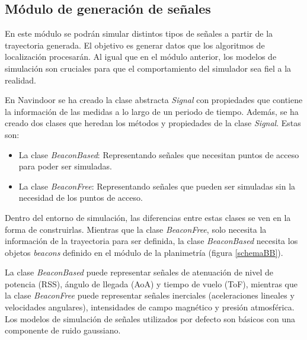 
\subsection{ Módulo de generación de señales}

En este módulo se podrán simular distintos tipos de señales a partir de la trayectoria generada. El objetivo es generar datos que los algoritmos de localización procesarán. Al igual que en el módulo anterior, los modelos de simulación son cruciales para que el comportamiento del simulador sea fiel a la realidad. 

En Navindoor se ha creado la clase abstracta \emph{Signal} con propiedades que contiene la información de las medidas a lo largo de un periodo de tiempo. Además, se ha creado dos clases que heredan los métodos y propiedades de la clase \emph{Signal}. Estas son:
\begin{itemize}
    \item La clase \emph{BeaconBased}: Representando señales que necesitan  puntos de acceso para poder ser simuladas. 
    \item La clase \emph{BeaconFree}: Representando señales que pueden ser simuladas sin la necesidad de los puntos de acceso.
   \end{itemize}

Dentro del entorno de simulación, las diferencias entre estas clases se ven en la forma de construirlas. Mientras que la clase \emph{BeaconFree}, solo necesita la información de la trayectoria para ser definida, la clase \emph{BeaconBased} necesita los objetos \emph{beacons} definido en el módulo de la planimetría (figura \ref{schemaBB}). 

La clase \emph{BeaconBased} puede representar señales de atenuación de nivel de potencia (RSS), ángulo de llegada (AoA) y tiempo de vuelo (ToF), mientras que la clase \emph{BeaconFree} puede representar señales inerciales (aceleraciones lineales y velocidades angulares), intensidades de campo magnético y presión atmosférica. Los modelos de simulación de señales utilizados por defecto son básicos con una componente de ruido gaussiano.


